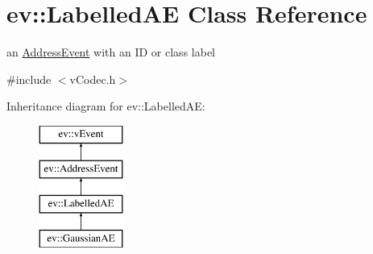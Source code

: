 \hypertarget{classev_1_1LabelledAE}{}\section{ev\+:\+:Labelled\+AE Class Reference}
\label{classev_1_1LabelledAE}


an \hyperlink{classev_1_1AddressEvent}{Address\+Event} with an ID or class label  




{\ttfamily \#include $<$v\+Codec.\+h$>$}

Inheritance diagram for ev\+:\+:Labelled\+AE\+:\begin{figure}[H]
\begin{center}
\leavevmode
\includegraphics[height=4.000000cm]{classev_1_1LabelledAE}
\end{center}
\end{figure}

